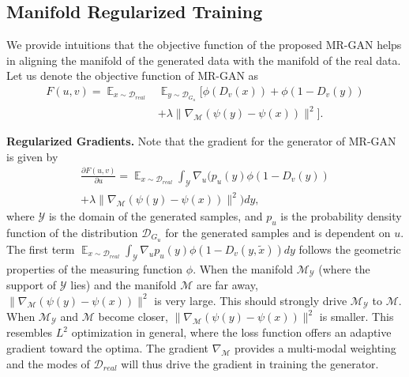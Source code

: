 \documentclass[10pt,twocolumn,letterpaper]{article}
\newcommand{\nn}{\nonumber}
\newcommand{\g}{{G_u}}
\newcommand{\di}{{D_v}}
\newcommand{\D}{\mathcal{D}}
\newcommand{\E}{\mathbb{E}}
\newcommand{\xt}{{\tilde{x}}}
\newcommand{\M}{\mathcal{M}}
\newcommand{\Y}{\mathcal{Y}}
\begin{document}
\subsection{Manifold Regularized Training}
We provide intuitions that the objective function of the proposed MR-GAN helps in aligning the manifold of the generated data with the manifold of the real data. Let us denote the objective function of MR-GAN as 
\begin{align}
F(u,v)= \mathop{\E}_{x\sim \D_{real}}&\mathop{\E}_{y\sim \D_{\g}}[\phi (\di(x))+ \phi(1-\di(y))\nn\\
&+\lambda \|\nabla_\M (\psi(y)-\psi(x))\|^2].
\end{align}

{\textbf{Regularized Gradients.}} Note that the gradient for the generator of MR-GAN is given by
\begin{align}
\frac{\partial F(u,v)}{\partial u} = \mathop{\E}_{x\sim \D_{real}}\int_{\mathcal{Y}}\nabla_u (p_u(y) \phi(1-\di(y))\nn\\+\lambda \|\nabla_\M (\psi(y)-\psi(x))\|^2)dy,
\end{align}
where $\mathcal{Y}$ is the domain of the generated samples, and $p_u$ is the probability density function of the distribution $\D_{\g}$ for the generated samples and is dependent on $u$.  
The first term $\mathop{\E}_{x\sim \D_{real}}\int_{\mathcal{Y}}\nabla_u p_u(y) \phi(1-\di(y,\xt))dy$ follows the geometric properties of the measuring function $\phi$.
When the manifold $\M_\Y$ (where the support of $\mathcal Y$ lies) and the manifold $\M$ are far away, $\|\nabla_\M (\psi(y)-\psi(x))\|^2$ is very large. This should strongly drive $\M_\Y$ to $\M$. When $\M_\Y$ and $\M$ become closer, $\|\nabla_\M (\psi(y)-\psi(x))\|^2$ is smaller. This resembles $L^2$ optimization in general, where the loss function offers an adaptive gradient toward the optima. The gradient $\nabla_\M$ provides a {{multi-modal weighting}} and the modes of $\D_{real}$ will thus drive the gradient in training the generator.
\end{document}
